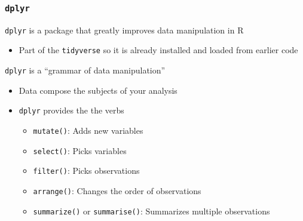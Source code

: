 \documentclass{beamer}\usepackage[]{graphicx}\usepackage[]{xcolor}
\begin{document}
\begin{frame}\frametitle{\texttt{dplyr}}
    \texttt{dplyr} is a package that greatly improves data manipulation in R
    \begin{itemize}
        \item Part of the \texttt{tidyverse} so it is already installed and loaded from earlier code
    \end{itemize}
    \vspace{3ex}
    \texttt{dplyr} is a ``grammar of data manipulation''
    \begin{itemize}
        \item Data compose the subjects of your analysis
        \item \texttt{dplyr} provides the the verbs
        \begin{itemize}
            \item \texttt{mutate()}: Adds new variables
            \item \texttt{select()}: Picks variables
            \item \texttt{filter()}: Picks observations
            \item \texttt{arrange()}: Changes the order of observations
            \item \texttt{summarize()} or \texttt{summarise()}: Summarizes multiple observations
        \end{itemize}
    \end{itemize}
\end{frame}
\end{document}
